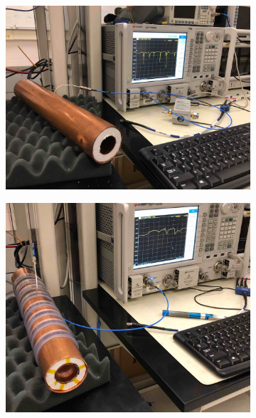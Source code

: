 \begin{figure}[htbp]
    \centering
    \begin{subfigure}{0.48\textwidth}
        \includegraphics*[width=\textwidth]{figs/Chapter-6/230612_open_cav_meas_image.jpg}
        \caption{}        
    \end{subfigure}
    \hfill
    \begin{subfigure}{0.48\textwidth}
        \includegraphics*[width=\textwidth]{figs/Chapter-6/230612_filtered_cav_meas_image.jpg}
        \caption{}
    \end{subfigure}
    \hfill
    \begin{subfigure}{0.48\textwidth}

\end{subfigure}
\end{figure}
